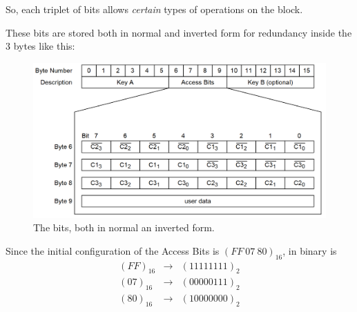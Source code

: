 \documentclass[target=bach,aauheader=,style=]{thud}
\begin{document}
So, each triplet of bits allows \emph{certain} types of operations on the block.\par

These bits are stored both in normal and inverted form for redundancy inside the 3 bytes like this: 

\begin{figure}
	\centering
	\includegraphics[scale=0.5]{accessconditions2} %
	\caption{The bits, both in normal an inverted form.}
	\label{fig:accessconditions2}
\end{figure}

Since the initial configuration of the Access Bits is $(FF\ 07\ 80)_{16}$, in binary is
\[
\begin{array}{ccc}
	(FF)_{16} & \rightarrow  & (11111111)_{2} \\
	(07)_{16} & \rightarrow  & (00000111)_{2} \\
	(80)_{16} & \rightarrow  & (10000000)_{2} \\
\end{array}
\]
\end{document}
